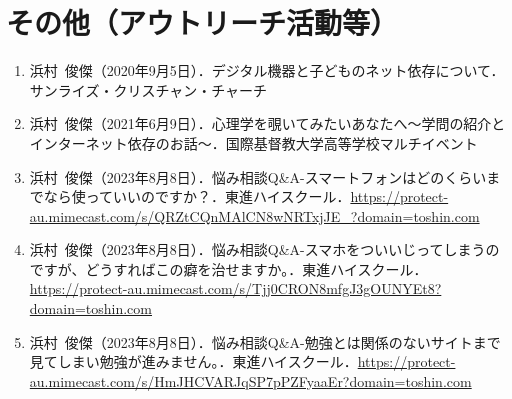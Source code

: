 \documentclass[11pt,a4paper]{article}
\begin{document}
\section{その他（アウトリーチ活動等）}
\begin{enumerate}
	\item 浜村\ 俊傑（2020年9月5日）．デジタル機器と子どものネット依存について．サンライズ・クリスチャン・チャーチ
	\item 浜村\ 俊傑（2021年6月9日）．心理学を覗いてみたいあなたへ〜学問の紹介とインターネット依存のお話〜．国際基督教大学高等学校マルチイベント
	\item 浜村\ 俊傑（2023年8月8日）．悩み相談Q\&A-スマートフォンはどのくらいまでなら使っていいのですか？．東進ハイスクール．\url{https://protect-au.mimecast.com/s/QRZtCQnMAlCN8wNRTxjJE_?domain=toshin.com}
	\item 浜村\ 俊傑（2023年8月8日）．悩み相談Q\&A-スマホをついいじってしまうのですが、どうすればこの癖を治せますか。．東進ハイスクール．\url{https://protect-au.mimecast.com/s/Tjj0CRON8mfgJ3gOUNYEt8?domain=toshin.com}
	\item 浜村\ 俊傑（2023年8月8日）．悩み相談Q\&A-勉強とは関係のないサイトまで見てしまい勉強が進みません。．東進ハイスクール．\url{https://protect-au.mimecast.com/s/HmJHCVARJqSP7pPZFyaaEr?domain=toshin.com}
\end{enumerate}
\end{document}
